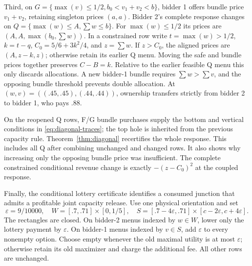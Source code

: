 Third, on $G=\{\max(v)\le1/2,b_0<v_1+v_2<b\}$, bidder 1 offers bundle
price $v_1+v_2$, retaining singleton prices $(a,a)$. Bidder 2's complete
response changes on $Q=\{\max(w)\le A,\sum w\le b\}$. For $\max(w)\le1/2$
its prices are $(A,A,\max(b_0,\sum w))$. In a constrained row write
$t=\max(w)>1/2$, $k=t-q$, $C_0=5/6+3k^2/4$, and $z=\sum w$.
If $z>C_0$, the aligned prices are $(A,z-k,z)$; otherwise retain its earlier
Q menu. Moving the safe and bundle prices together preserves $C-B=k$.
Relative to the earlier feasible Q menu this only discards allocations.
A new bidder-1 bundle requires $\sum w>\sum v$, and the opposing bundle
threshold prevents double allocation. At $(w,v)=((.45,.45),(.44,.44))$,
ownership transfers strictly from bidder 2 to bidder 1, who pays $.88$.

On the reopened Q rows, F/G bundle purchases supply the bottom and vertical
conditions in \eqref{eq:diagonal-traces}; the top hole is inherited from the
previous capacity rule. Theorem~\ref{thm:diagonal} recertifies the whole
response. This includes all Q after combining unchanged and changed rows.
It also shows why increasing only the opposing bundle price was insufficient.
The complete constrained conditional revenue change is exactly
$-(z-C_0)^2$ at the coupled response.

Finally, the conditional lottery certificate identifies a consumed
junction that admits a profitable joint capacity release. Use one physical
orientation and set
\[
\varepsilon=9/10000,\quad
W=[.7,.71]\times[0,1/5],\quad
S=[.7-4\varepsilon,.71]\times[c-2\varepsilon,c+4\varepsilon].
\]
The rectangles are closed. On bidder-2 menus indexed by $w\in W$, lower
only the lottery payment by $\varepsilon$. On bidder-1 menus indexed by
$v\in S$, add $\varepsilon$ to every nonempty option. Choose empty whenever
the old maximal utility is at most $\varepsilon$; otherwise retain its old
maximizer and charge the additional fee. All other rows are unchanged.

